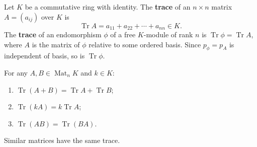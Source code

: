 Let $K$ be a commutative ring with identity. The \textbf{trace} of an $n \times n$ matrix $A = (a_{ij})$ over $K$ is
\[
\operatorname{Tr} A = a_{11} + a_{22} + \cdots + a_{nn} \in K.
\]
The \textbf{trace} of an endomorphism $\phi$ of a free $K$-module of rank $n$ is $\operatorname{Tr} \phi = \operatorname{Tr} A$, where $A$ is the matrix of $\phi$ relative to some ordered basis. Since $p_\phi = p_A$ is independent of basis, so is $\operatorname{Tr} \phi$.

For any $A, B \in \operatorname{Mat}_n K$ and $k \in K$:
\begin{enumerate}
\item $\operatorname{Tr}(A + B) = \operatorname{Tr} A + \operatorname{Tr} B$;
\item $\operatorname{Tr}(kA) = k \operatorname{Tr} A$;
\item $\operatorname{Tr}(AB) = \operatorname{Tr}(BA)$.
\end{enumerate}
Similar matrices have the same trace.
